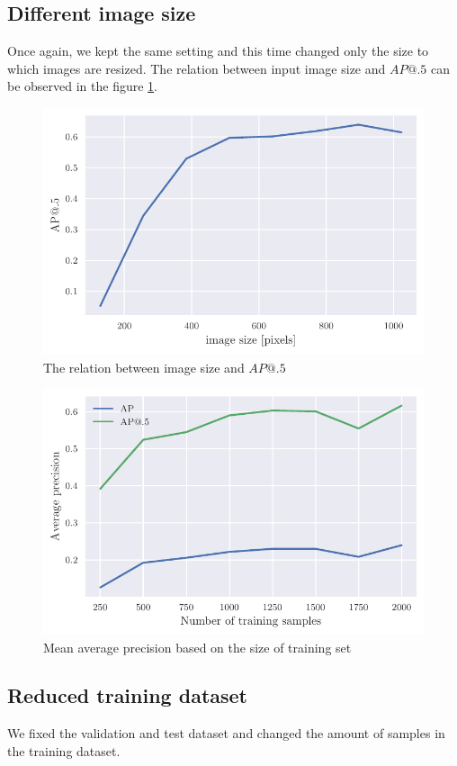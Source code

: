\subsection{Different image size}
Once again, we kept the same setting and this time changed only the size to which images are resized. The relation between input image size and $AP@.5$ can be observed in the figure \ref{fig:img_sizes}.

\begin{paracol}{2}
    \begin{figure}
        \centering
        \includegraphics[width=0.99\linewidth]{images/img_size_dependency.pdf}
        \caption{The relation between image size and $AP@.5$}
        \label{fig:img_sizes}
    \end{figure}
    \switchcolumn
    \begin{figure}
        \centering
        \includegraphics[width=0.99\linewidth]{images/training_set_dependency.pdf}
        \caption{Mean average precision based on the size of training set}
        \label{fig:training_set_sizes}
    \end{figure}
\end{paracol}

\subsection{Reduced training dataset}
We fixed the validation and test dataset and changed the amount of samples in the training dataset.


